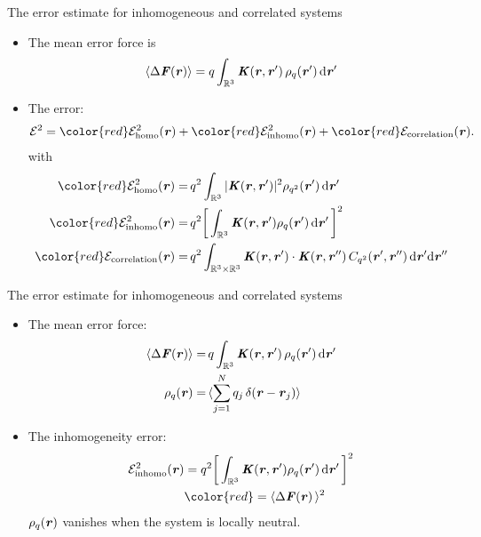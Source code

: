 \documentclass{beamer}
\newcommand{\redc}[1]{{\color{red} #1}}
\newcommand{\bluec}[1]{{\color{blue} #1}}
\newcommand{\vect}[1]{\textbf{\textit{#1}}}
\renewcommand{\d}[1]{\textrm{#1}}
\begin{document}
\begin{frame}{The error estimate for inhomogeneous and correlated systems}
  \begin{itemize}\itemsep -10pt
  \item<1->   The mean error force is
    \bluec{
      \begin{align*}
        \langle\Delta\vect F(\vect r)\rangle
        =
        q\int_{\mathbb R^3}\vect K(\vect r , \vect r')\,\rho_q(\vect r')\,\d d\vect r'
      \end{align*}
    }
  \vskip -10cm
\item<2->   The error:
  \bluec{
    \begin{align*} \nonumber
      \mathcal E^2
      = 
      \redc{\mathcal E^2_{\textrm{homo}}(\vect r)} +
      \redc{\mathcal E^2_{\textrm{inhomo}}(\vect r)} +
      \redc{\mathcal E_{\textrm{correlation}}(\vect r)}.
    \end{align*}
  }
  with\bluec{
  \begin{align*}
    \redc{\mathcal E^2_{\textrm{homo}}(\vect r)}
    = &\,
    q^2\int_{\mathbb R^3}\vert\vect K(\vect r, \vect r')\vert^2\rho_{q^2}(\vect r')\,\d d\vect r'  \\
    \redc{\mathcal E^2_{\textrm{inhomo}}(\vect r)}
    = &\,
    q^2\bigg[\int_{\mathbb R^3}\vect K(\vect r, \vect r')\rho_q(\vect r')\,\d d\vect r'\,\bigg]^2
    \\
    \redc{\mathcal E_{\textrm{correlation}}(\vect r)}
    =&\,
    q^2\int_{\mathbb R^3\times\mathbb R^3}\vect K(\vect r, \vect r')\cdot\vect K(\vect r, \vect r'')\,C_{q^2}(\vect r', \vect r'')\,\d d\vect r'\d d\vect r''
  \end{align*}}
  \end{itemize}
\end{frame}

\begin{frame}{The error estimate for inhomogeneous and correlated systems}
  \begin{itemize}
  \item <1-> The mean error force:
    \bluec{
      \begin{align*}
        \langle\Delta\vect F(\vect r)\rangle
        =&\,
        q\int_{\mathbb R^3}\vect K(\vect r , \vect r')\,\rho_q(\vect r')\,\d d\vect r'     \\
        \rho_{q}(\vect r) =&\,
        \langle \sum_{j=1}^Nq_j\,\delta(\vect r - \vect r_j) \rangle        
      \end{align*}}
  \item <2-> The inhomogeneity error:
    \bluec{
      \begin{align*}
        {\mathcal E^2_{\textrm{inhomo}}(\vect r)}
        &=
        q^2\bigg[\int_{\mathbb R^3}\vect K(\vect r, \vect r')\rho_q(\vect r')\,\d d\vect r'\,\bigg]^2\\
        & 
        \redc{ = \langle\Delta\vect F(\vect r)\,\rangle^2}
      \end{align*}}
    \bluec{$\rho_{q}(\vect r)$} vanishes when the system is \redc{locally neutral}.
  \end{itemize}
\end{frame}
\end{document}
